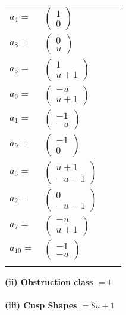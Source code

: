 \documentclass[1p]{elsarticle_modified}
\theoremstyle{definition}
\begin{document}
\begin{tabular}{m{7pt} m{180pt} m{7pt} m{180pt} }
\flushright $a_{4}=$&$\begin{pmatrix}1\\0\end{pmatrix}$ \\
\flushright $a_{8}=$&$\begin{pmatrix}0\\u\end{pmatrix}$ \\
\flushright $a_{5}=$&$\begin{pmatrix}1\\u+1\end{pmatrix}$ \\
\flushright $a_{6}=$&$\begin{pmatrix}- u\\u+1\end{pmatrix}$ \\
\flushright $a_{1}=$&$\begin{pmatrix}-1\\- u\end{pmatrix}$ \\
\flushright $a_{9}=$&$\begin{pmatrix}-1\\0\end{pmatrix}$ \\
\flushright $a_{3}=$&$\begin{pmatrix}u+1\\- u-1\end{pmatrix}$ \\
\flushright $a_{2}=$&$\begin{pmatrix}0\\- u-1\end{pmatrix}$ \\
\flushright $a_{7}=$&$\begin{pmatrix}- u\\u+1\end{pmatrix}$ \\
\flushright $a_{10}=$&$\begin{pmatrix}-1\\- u\end{pmatrix}$\\&\end{tabular}
\flushleft \textbf{(ii) Obstruction class $= 1$}\\~\\
\flushleft \textbf{(iii) Cusp Shapes $= 8 u+1$}\\~\\
\end{document}
